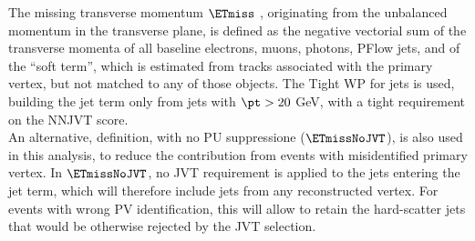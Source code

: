 The missing transverse momentum $\ETmiss$ , originating from the unbalanced momentum in the transverse plane, is defined as the negative vectorial sum of the transverse momenta of all baseline
electrons, muons, photons, PFlow jets, and of the “soft term”, which is estimated from tracks associated with the primary vertex, but not matched to any of those objects. The Tight WP for jets is used, building the jet term only from jets with $\pt > 20$ GeV, with a tight requirement on the NNJVT score.\\
An alternative, \ETmiss definition, with no PU suppressione ($\ETmissNoJVT$), is also used in this analysis, to reduce the contribution from events with misidentified primary vertex. In $\ETmissNoJVT$, no JVT requirement is applied to the jets entering the jet term, which will therefore include jets from any reconstructed vertex. For events with wrong PV identification, this will allow to retain the hard-scatter jets that would be otherwise rejected by the JVT selection. 